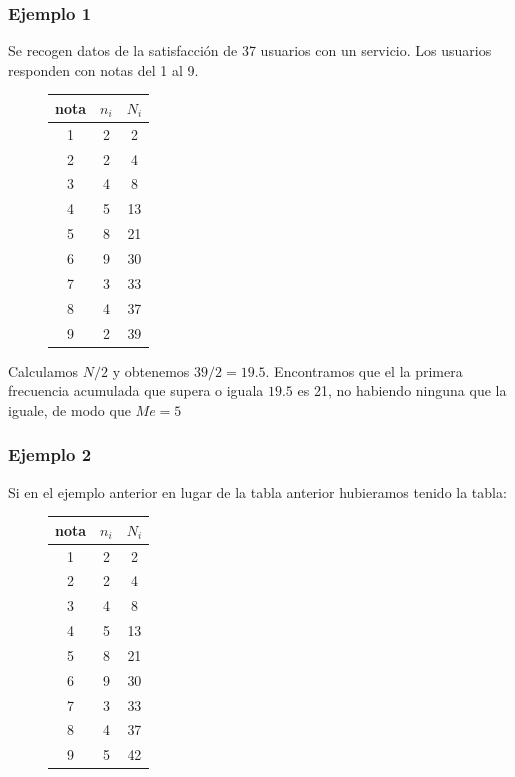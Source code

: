 \documentclass[]{article}
\theoremstyle{plain}
\theoremstyle{definition}
\theoremstyle{definition} %
\begin{document}
\hypertarget{ejemplo-1-1}{%
\subsubsection{Ejemplo 1}\label{ejemplo-1-1}}

Se recogen datos de la satisfacción de 37 usuarios con un servicio. Los
usuarios responden con notas del 1 al 9.

\begin{figure}
  \centering
\begin{tabular}{ccc}
nota & \(n_i\) & \(N_i\)\\
\hline
1 & 2 & 2 \\
2 & 2 & 4 \\
3 & 4 & 8 \\
4 & 5 & 13\\
5 & 8 & 21\\
6 & 9 & 30\\
7 & 3 & 33\\
8 & 4 & 37\\
9 & 2 & 39\\
\end{tabular}
\end{figure}

Calculamos \(N/2\) y obtenemos \(39/2 = 19.5\). Encontramos que el la
primera frecuencia acumulada que supera o iguala \(19.5\) es 21, no
habiendo ninguna que la iguale, de modo que \(Me = 5\)

\hypertarget{ejemplo-2-1}{%
\subsubsection{Ejemplo 2}\label{ejemplo-2-1}}

Si en el ejemplo anterior en lugar de la tabla anterior hubieramos
tenido la tabla:

\begin{figure}
  \centering
\begin{tabular}{ccc}
nota & \(n_i\) & \(N_i\)\\
\hline
1 & 2 & 2 \\
2 & 2 & 4 \\
3 & 4 & 8 \\
4 & 5 & 13\\
5 & 8 & 21\\
6 & 9 & 30\\
7 & 3 & 33\\
8 & 4 & 37\\
9 & 5 & 42\\
\end{tabular}
\end{figure}
\end{document}
